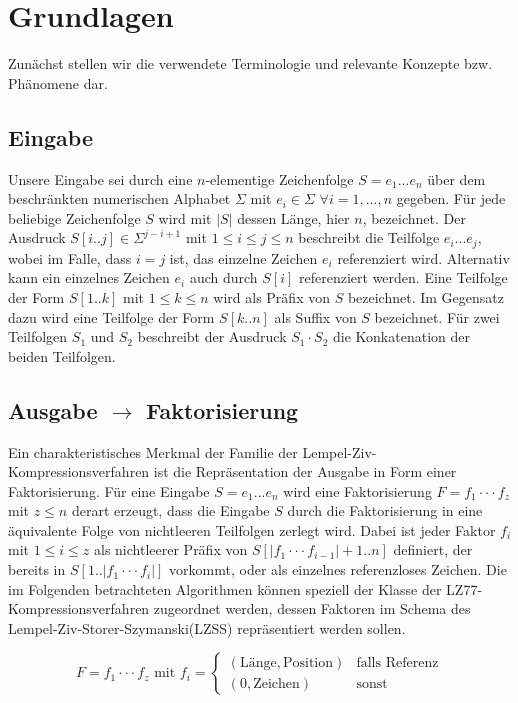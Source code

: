 \chapter{Grundlagen}

Zunächst stellen wir die verwendete Terminologie und relevante Konzepte bzw. Phänomene dar.

\section{Eingabe}
Unsere Eingabe sei durch eine $n$-elementige Zeichenfolge $S=e_1...e_n$ über dem beschränkten numerischen Alphabet $\Sigma$ mit $e_i\in \Sigma$ $\forall i=1,...,n$ gegeben. Für jede
beliebige Zeichenfolge $S$ wird mit $|S|$ dessen Länge, hier $n$, bezeichnet. Der Ausdruck $S[i..j]\in \Sigma^{j-i+1}$ mit $1\leq i\leq j\leq n$ beschreibt die Teilfolge $e_i...e_j$,
wobei im Falle, dass $i=j$ ist, das einzelne Zeichen $e_i$ referenziert wird. Alternativ kann ein einzelnes Zeichen $e_i$ auch durch $S[i]$ referenziert werden. Eine Teilfolge 
der Form $S[1..k]$ mit $1\leq k\leq n$ wird als Präfix von $S$ bezeichnet. Im Gegensatz dazu wird eine Teilfolge der Form $S[k..n]$ als Suffix von $S$ bezeichnet. Für zwei Teilfolgen
$S_1$ und $S_2$ beschreibt der Ausdruck $S_1\cdot S_2$ die Konkatenation der beiden Teilfolgen.

\section{Ausgabe $\rightarrow$ Faktorisierung}
Ein charakteristisches Merkmal der Familie der Lempel-Ziv-Kompressionsverfahren \cite{LemZiv} ist die Repräsentation der Ausgabe in Form einer Faktorisierung. Für eine Eingabe $S=e_1...e_n$ 
wird eine Faktorisierung $F=f_1\cdot\cdot\cdot f_z$ mit $z\leq n$ derart erzeugt, dass die Eingabe $S$ durch die Faktorisierung in eine äquivalente Folge von nichtleeren Teilfolgen 
zerlegt wird. Dabei ist jeder Faktor $f_i$ mit $1\leq i\leq z$ als nichtleerer Präfix von $S[|f_1\cdot\cdot\cdot f_{i-1}|+1..n]$ definiert, der bereits in $S[1..|f_1\cdot\cdot\cdot f_i|]$ 
vorkommt, oder als einzelnes referenzloses Zeichen. Die im Folgenden betrachteten Algorithmen können speziell der Klasse der LZ77-Kompressionsverfahren zugeordnet werden, dessen Faktoren im Schema 
des Lempel-Ziv-Storer-Szymanski(LZSS) \cite{lzss} repräsentiert werden sollen. 

\begin{equation} \label{eq:faktor}
    F = f_1\cdot\cdot\cdot f_z \text{ mit } f_i = \begin{cases} (\text{Länge}, \text{Position}) & \text{falls Referenz} \\ (0, \text{Zeichen}) & \text{sonst} \end{cases}
\end{equation}

